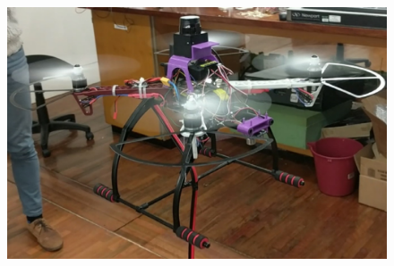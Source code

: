 \documentclass[capstone_report.tex]{subfiles}
\begin{document}
    \begin{figure}  [H]
	\centering
        \includegraphics[width=0.6\linewidth]{imgs/real.png}
        \label{fig:real}
    \end{figure}
\end{document}
